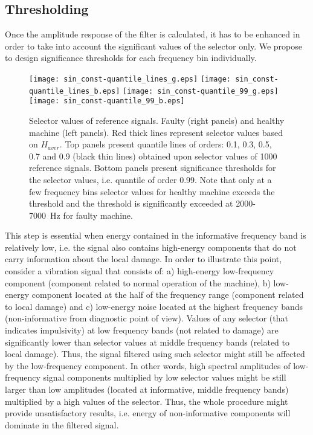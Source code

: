 \documentclass[11pt]{article} %
\begin{document}
\subsection{Thresholding}\label{thresholding}
Once the amplitude response of the filter is calculated, it has to be enhanced in order to take into account the significant values of the selector only. We propose to design significance thresholds for each frequency bin individually.
\begin{figure}[!ht]
\begin{center}
\texttt{[image: sin\_const-quantile\_lines\_g.eps]}
\texttt{[image: sin\_const-quantile\_lines\_b.eps]}
\texttt{[image: sin\_const-quantile\_99\_g.eps]}
\texttt{[image: sin\_const-quantile\_99\_b.eps]}
\caption{Selector values of reference signals. Faulty (right panels) and healthy machine (left panels). Red thick lines represent selector values based on $H_{aver}$. Top panels present quantile lines of orders: 0.1, 0.3, 0.5, 0.7 and 0.9 (black thin lines) obtained upon selector values of 1000 reference signals. Bottom panels present significance thresholds for the selector values, i.e. quantile of order 0.99. Note that only at a few frequency bins selector values for healthy machine exceeds the threshold and the threshold is significantly exceeded at 2000-7000~Hz for faulty machine.\label{sim-selekt}}
\end{center}
\end{figure}
This step is essential when energy contained in the informative frequency band is relatively low, i.e. the signal also contains high-energy components that do not carry information about the local damage. In order to illustrate this point, consider a vibration signal that consists of: a) high-energy low-frequency component (component related to normal operation of the machine), b) low-energy component located at the half of the frequency range (component related to local damage) and c) low-energy noise located at the highest frequency bands (non-informative from diagnostic point of view). Values of any selector (that indicates impulsivity) at low frequency bands (not related to damage) are significantly lower than selector values at middle frequency bands (related to local damage). Thus, the signal filtered using such selector might still be affected by the low-frequency component. In other words, high spectral amplitudes of low-frequency signal components multiplied by low selector values might be still larger than low amplitudes (located at informative, middle frequency bands) multiplied by a high values of the selector. Thus, the whole procedure might provide unsatisfactory results, i.e. energy of non-informative components will dominate in the filtered signal.\\
\end{document}
